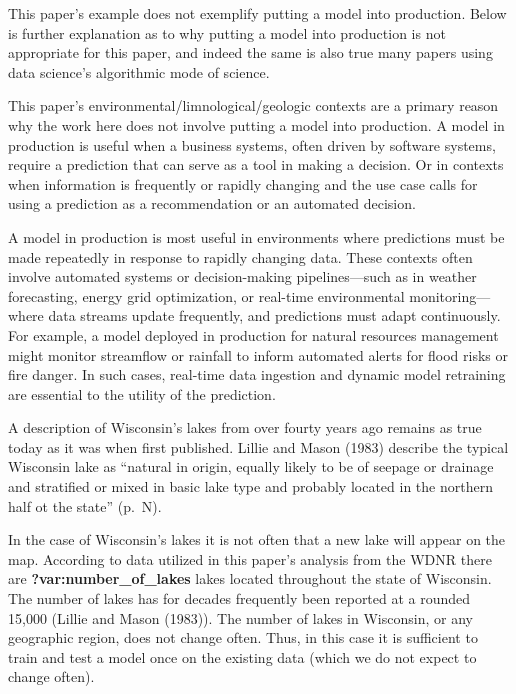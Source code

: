 \documentclass[
]{article}
\begin{document}
This paper's example does not exemplify putting a model into production.
Below is further explanation as to why putting a model into production
is not appropriate for this paper, and indeed the same is also true many
papers using data science's algorithmic mode of science.

This paper's environmental/limnological/geologic contexts are a primary
reason why the work here does not involve putting a model into
production. A model in production is useful when a business systems,
often driven by software systems, require a prediction that can serve as
a tool in making a decision. Or in contexts when information is
frequently or rapidly changing and the use case calls for using a
prediction as a recommendation or an automated decision.

\begin{tcolorbox}[enhanced jigsaw, coltitle=black, toprule=.15mm, arc=.35mm, bottomtitle=1mm, opacityback=0, leftrule=.75mm, left=2mm, colframe=quarto-callout-note-color-frame, toptitle=1mm, titlerule=0mm, breakable, colbacktitle=quarto-callout-note-color!10!white, colback=white, bottomrule=.15mm, title=\textcolor{quarto-callout-note-color}{\faInfo}\hspace{0.5em}{Note}, rightrule=.15mm, opacitybacktitle=0.6]

A model in production is most useful in environments where predictions
must be made repeatedly in response to rapidly changing data. These
contexts often involve automated systems or decision-making
pipelines---such as in weather forecasting, energy grid optimization, or
real-time environmental monitoring---where data streams update
frequently, and predictions must adapt continuously. For example, a
model deployed in production for natural resources management might
monitor streamflow or rainfall to inform automated alerts for flood
risks or fire danger. In such cases, real-time data ingestion and
dynamic model retraining are essential to the utility of the prediction.

\end{tcolorbox}

A description of Wisconsin's lakes from over fourty years ago remains as
true today as it was when first published. Lillie and Mason (1983)
describe the typical Wisconsin lake as ``natural in origin, equally
likely to be of seepage or drainage and stratified or mixed in basic
lake type and probably located in the northern half ot the state''
(p.~N).

In the case of Wisconsin's lakes it is not often that a new lake will
appear on the map. According to data utilized in this paper's analysis
from the WDNR there are \textbf{?var:number\_of\_lakes} lakes located
throughout the state of Wisconsin. The number of lakes has for decades
frequently been reported at a rounded 15,000 (Lillie and Mason (1983)).
The number of lakes in Wisconsin, or any geographic region, does not
change often. Thus, in this case it is sufficient to train and test a
model once on the existing data (which we do not expect to change
often).
\end{document}
